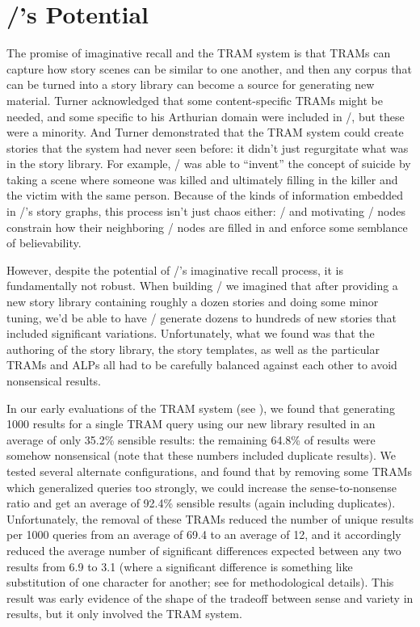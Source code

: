 \section{\minstrel/'s Potential}

The promise of imaginative recall and the TRAM system is that TRAMs can capture how story scenes can be similar to one another, and then any corpus that can be turned into a story library can become a source for generating new material.
%
Turner acknowledged that some content-specific TRAMs might be needed, and some specific to his Arthurian domain were included in \minstrel/, but these were a minority.
%
And Turner demonstrated that the TRAM system could create stories that the system had never seen before: it didn't just regurgitate what was in the story library.
%
For example, \minstrel/ was able to ``invent'' the concept of suicide by taking a scene where someone was killed and ultimately filling in the killer and the victim with the same person.
%
Because of the kinds of information embedded in \minstrel/'s story graphs, this process isn't just chaos either: \gng/ and motivating \gns/ nodes constrain how their neighboring \gna/ nodes are filled in and enforce some semblance of believability.


However, despite the potential of \minstrel/'s imaginative recall process, it is fundamentally not robust.
%
When building \skald/ we imagined that after providing a new story library containing roughly a dozen stories and doing some minor tuning, we'd be able to have \skald/ generate dozens to hundreds of new stories that included significant variations.
%
Unfortunately, what we found was that the authoring of the story library, the story templates, as well as the particular TRAMs and ALPs all had to be carefully balanced against each other to avoid nonsensical results.


In our early evaluations of the TRAM system (see \citep{Tearse2011}), we found that generating 1000 results for a single TRAM query using our new library resulted in an average of only 35.2\% sensible results: the remaining 64.8\% of results were somehow nonsensical (note that these numbers included duplicate results).
%
We tested several alternate configurations, and found that by removing some TRAMs which generalized queries too strongly, we could increase the sense-to-nonsense ratio and get an average of 92.4\% sensible results (again including duplicates).
%
Unfortunately, the removal of these TRAMs reduced the number of unique results per 1000 queries from an average of 69.4 to an average of 12, and it accordingly reduced the average number of significant differences expected between any two results from  6.9 to 3.1 (where a significant difference is something like substitution of one character for another; see \citep{Tearse2011} for methodological details).
%
This result was early evidence of the shape of the tradeoff between sense and variety in results, but it only involved the TRAM system.


